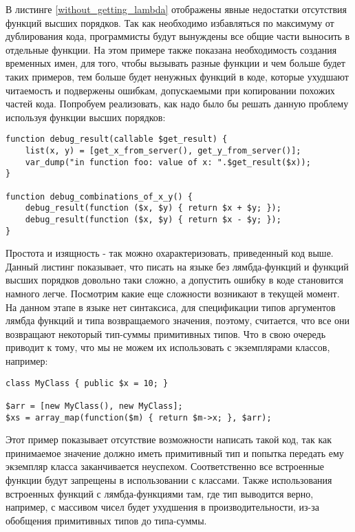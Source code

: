 В листинге \ref{without_getting_lambda} отображены явные недостатки отсутствия функций высших порядков.
Так как необходимо избавляться по максимуму от дублирования кода, программисты будут вынуждены все общие части выносить в отдельные функции.
На этом примере также показана необходимость создания временных имен, для того, чтобы вызывать разные функции и чем больше будет таких примеров, тем больше будет ненужных функций в коде, которые ухудшают читаемость и подвержены ошибкам, допускаемыми при копировании похожих частей кода.
Попробуем реализовать, как надо было бы решать данную проблему используя функции высших порядков:
\begin{lstlisting}
function debug_result(callable $get_result) {
	list(x, y) = [get_x_from_server(), get_y_from_server()];
	var_dump("in function foo: value of x: ".$get_result($x));
}

function debug_combinations_of_x_y() {
	debug_result(function ($x, $y) { return $x + $y; });
	debug_result(function ($x, $y) { return $x - $y; });
}
\end{lstlisting}

Простота и изящность - так можно охарактеризовать, приведенный код выше.
Данный листинг показывает, что писать на языке без лямбда-функций и функций высших порядков довольно таки сложно, а допустить ошибку в коде становится намного легче.
Посмотрим какие еще сложности возникают в текущей момент.
На данном этапе в языке нет синтаксиса, для спецификации типов аргументов лямбда функций и типа возвращаемого значения, поэтому, считается, что все они возвращают некоторый тип-суммы примитивных типов.
Что в свою очередь приводит к тому, что мы не можем их использовать с экземплярами классов, например:
\begin{lstlisting}
class MyClass { public $x = 10; }

$arr = [new MyClass(), new MyClass];
$xs = array_map(function($m) { return $m->x; }, $arr);
\end{lstlisting}

Этот пример показывает отсутствие возможности написать такой код, так как принимаемое значение должно иметь примитивный тип и попытка передать ему экземпляр класса заканчивается неуспехом.
Соответственно все встроенные функции будут запрещены в использовании с классами.
Также использования встроенных функций с лямбда-функциями там, где тип выводится верно, например, с массивом чисел будет ухудшения в производительности, из-за обобщения примитивных типов до типа-суммы.
\finishrelatedwork

